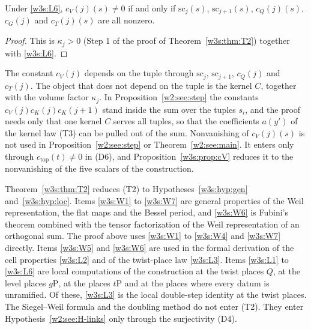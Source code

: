 \begin{proposition}[nonvanishing of $c_V(j)$]\label{w3s:prop:cV}
Under \ref{w3s:L6}, $c_V(j)(s)\ne0$ if and only if $\mathrm{sc}_j(s)$, $\mathrm{sc}_{j+1}(s)$, $c_Q(j)(s)$, $c_G(j)$ and $c_T(j)(s)$ are all nonzero.
\end{proposition}

\begin{proof}
This is $\kappa_j>0$ (Step 1 of the proof of Theorem~\ref{w3s:thm:T2}) together with \ref{w3s:L6}.
\end{proof}

\begin{remark}[normalization]\label{w3s:rem:corr}
The constant $c_V(j)$ depends on the tuple through $\mathrm{sc}_j$, $\mathrm{sc}_{j+1}$, $c_Q(j)$ and $c_T(j)$. The object that does not depend on the tuple is the kernel $C$, together with the volume factor $\kappa_j$. In Proposition~\ref{w2:see:step} the constants $c_V(j)c_K(j)c_K(j+1)$ stand inside the sum over the tuples $s_i$, and the proof needs only that one kernel $C$ serves all tuples, so that the coefficients $a(y')$ of the kernel law (T3) can be pulled out of the sum. Nonvanishing of $c_V(j)(s)$ is not used in Proposition~\ref{w2:see:step} or Theorem~\ref{w2:see:main}. It enters only through $c_{\mathrm{top}}(t)\ne0$ in (D6), and Proposition~\ref{w3s:prop:cV} reduces it to the nonvanishing of the five scalars of the construction.
\end{remark}

\begin{remark}\label{w3s:rem:open}
Theorem~\ref{w3s:thm:T2} reduces (T2) to Hypotheses~\ref{w3s:hyp:gen} and~\ref{w3s:hyp:loc}. Items \ref{w3s:W1} to \ref{w3s:W7} are general properties of the Weil representation, the flat maps and the Bessel period, and \ref{w3s:W6} is Fubini's theorem combined with the tensor factorization of the Weil representation of an orthogonal sum. The proof above uses \ref{w3s:W1} to \ref{w3s:W4} and \ref{w3s:W7} directly. Items \ref{w3s:W5} and \ref{w3s:W6} are used in the formal derivation of the cell properties \ref{w3s:L2} and of the twist-place law \ref{w3s:L3}. Items \ref{w3s:L1} to \ref{w3s:L6} are local computations of the construction at the twist places $Q$, at the level places $g\mathrm P$, at the places $t\mathrm P$ and at the places where every datum is unramified. Of these, \ref{w3s:L3} is the local double-step identity at the twist places. The Siegel--Weil formula and the doubling method do not enter (T2). They enter Hypothesis~\ref{w2:see:H-links} only through the surjectivity (D4).
\end{remark}


